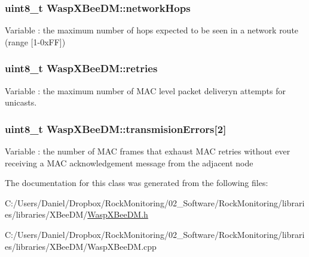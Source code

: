 \subsubsection[{\texorpdfstring{network\+Hops}{networkHops}}]{\setlength{\rightskip}{0pt plus 5cm}uint8\+\_\+t Wasp\+X\+Bee\+D\+M\+::network\+Hops}\hypertarget{class_wasp_x_bee_d_m_ab31869e8f1dc35ded13fbe9c235fe95d}{}\label{class_wasp_x_bee_d_m_ab31869e8f1dc35ded13fbe9c235fe95d}
Variable \+: the maximum number of hops expected to be seen in a network route (range \mbox{[}1-\/0x\+FF\mbox{]}) 
\subsubsection[{\texorpdfstring{retries}{retries}}]{\setlength{\rightskip}{0pt plus 5cm}uint8\+\_\+t Wasp\+X\+Bee\+D\+M\+::retries}\hypertarget{class_wasp_x_bee_d_m_a71a8d4f44010a7660147da19f814bfb3}{}\label{class_wasp_x_bee_d_m_a71a8d4f44010a7660147da19f814bfb3}
Variable \+: the maximum number of M\+AC level packet deliveryn attempts for unicasts. 
\subsubsection[{\texorpdfstring{transmision\+Errors}{transmisionErrors}}]{\setlength{\rightskip}{0pt plus 5cm}uint8\+\_\+t Wasp\+X\+Bee\+D\+M\+::transmision\+Errors\mbox{[}2\mbox{]}}\hypertarget{class_wasp_x_bee_d_m_ac69aa4bfd16eac93d3e1fb93ad4b41cd}{}\label{class_wasp_x_bee_d_m_ac69aa4bfd16eac93d3e1fb93ad4b41cd}
Variable \+: the number of M\+AC frames that exhaust M\+AC retries without ever receiving a M\+AC acknowledgement message from the adjacent node 

The documentation for this class was generated from the following files\+:\begin{DoxyCompactItemize}
\item 
C\+:/\+Users/\+Daniel/\+Dropbox/\+Rock\+Monitoring/02\+\_\+\+Software/\+Rock\+Monitoring/libraries/libraries/\+X\+Bee\+D\+M/\hyperlink{_wasp_x_bee_d_m_8h}{Wasp\+X\+Bee\+D\+M.\+h}\item 
C\+:/\+Users/\+Daniel/\+Dropbox/\+Rock\+Monitoring/02\+\_\+\+Software/\+Rock\+Monitoring/libraries/libraries/\+X\+Bee\+D\+M/Wasp\+X\+Bee\+D\+M.\+cpp\end{DoxyCompactItemize}
